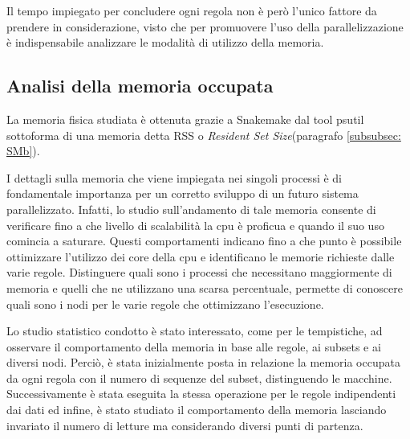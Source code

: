 Il tempo impiegato per concludere ogni regola non è però l'unico fattore da prendere in considerazione, visto che per promuovere l'uso della parallelizzazione è indispensabile analizzare le modalità di utilizzo della memoria. 

\subsection{Analisi della memoria occupata}
\label{subsec:Mf}
La memoria fisica studiata è ottenuta grazie a Snakemake dal tool psutil sottoforma di una memoria detta RSS o \textit{Resident Set Size}(paragrafo \ref{subsubsec: SMb}). 

I dettagli sulla memoria che viene impiegata nei singoli processi è di fondamentale importanza per un corretto sviluppo di un futuro sistema parallelizzato.
Infatti, lo studio sull'andamento di tale memoria consente di verificare fino a che livello di scalabilità la cpu è proficua e quando il suo uso comincia a saturare.
Questi comportamenti indicano fino a che punto è possibile ottimizzare l'utilizzo dei core della cpu e identificano le memorie richieste dalle varie regole.
Distinguere quali sono i processi che necessitano maggiormente di memoria e quelli che ne utilizzano una scarsa percentuale, permette di conoscere quali sono i nodi per le varie regole che ottimizzano l'esecuzione.

Lo studio statistico condotto è stato interessato, come per le tempistiche, ad osservare il comportamento della memoria in base alle regole, ai subsets e ai diversi nodi.
Perciò, è stata inizialmente posta in relazione la memoria occupata da ogni regola con il numero di sequenze del subset, distinguendo le macchine.
Successivamente è stata eseguita la stessa operazione per le regole indipendenti dai dati ed infine, è stato studiato il comportamento della memoria lasciando invariato il numero di letture ma considerando diversi punti di partenza.
    

